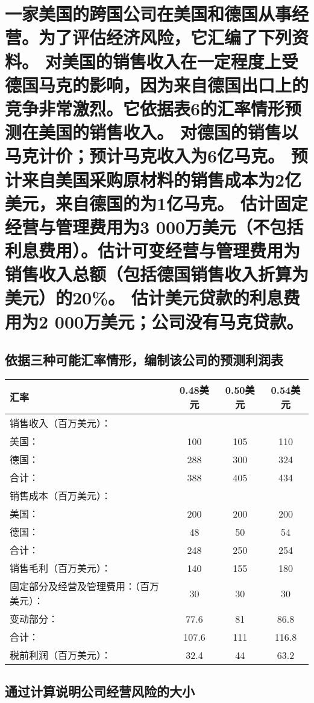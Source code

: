 \documentclass[UTF8]{ctexart}
\begin{document}
\section{一家美国的跨国公司在美国和德国从事经营。为了评估经济风险，它汇编了下列资料。
对美国的销售收入在一定程度上受德国马克的影响，因为来自德国出口上的竞争非常激烈。它依据表6的汇率情形预测在美国的销售收入。
对德国的销售以马克计价；预计马克收入为6亿马克。
预计来自美国采购原材料的销售成本为2亿美元，来自德国的为1亿马克。
估计固定经营与管理费用为3 000万美元（不包括利息费用）。估计可变经营与管理费用为销售收入总额（包括德国销售收入折算为美元）的20\%。
估计美元贷款的利息费用为2 000万美元；公司没有马克贷款。
}
\subsection{依据三种可能汇率情形，编制该公司的预测利润表}
\begin{table}[H]
    \centering
    \begin{tabular}[]{lccc}
        \hline
        汇率&0.48美元&0.50美元&0.54美元\\
        \hline
        销售收入（百万美元）：&\\
        美国：&100&105&110\\
        德国：&288&300&324\\
        合计：&388&405&434\\
        \hline
        销售成本（百万美元）：&\\
        美国：&200&200&200\\
        德国：&48&50&54\\
        合计：&248&250&254\\
        \hline
        销售毛利（百万美元）：&140&155&180\\
        \hline
        固定部分及经营及管理费用：（百万美元）：&30&30&30\\
        变动部分：&77.6&81&86.8\\
        合计：&107.6&111&116.8\\
        \hline
        税前利润（百万美元）：&32.4&44&63.2\\
        \hline
    \end{tabular}
\end{table}
\subsection{通过计算说明公司经营风险的大小}
\end{document}
